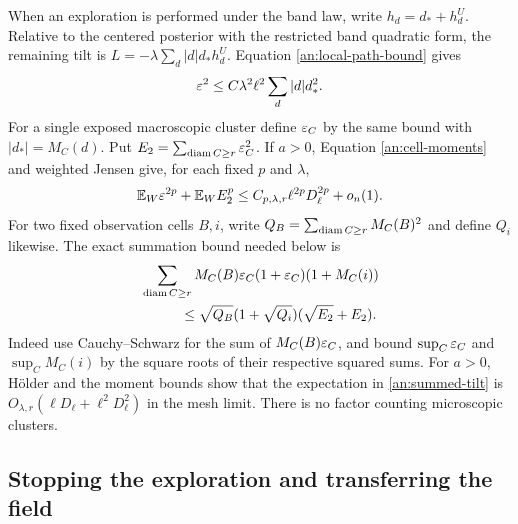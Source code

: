 When an exploration is performed under the band law, write
$h_d=d_*+h_d^U$.  Relative to the centered posterior with the
restricted band quadratic form, the remaining tilt is
$L=-\lambda\sum_d|d|d_*h_d^U$.  Equation
\eqref{an:local-path-bound} gives
\begin{equation}
 \varepsilon^2\le C\lambda^2\ell^2\sum_d|d|d_*^2.
 \label{an:exterior-tilt}
\end{equation}
For a single exposed macroscopic cluster define $\varepsilon_C$ by the
same bound with $|d_*|=M_C(d)$.  Put
$E_2=\sum_{\operatorname{diam} C\ge r}\varepsilon_C^2$.  If $a>0$, Equation
\eqref{an:cell-moments} and weighted Jensen give, for each fixed
$p$ and $\lambda$,
\begin{equation}
 \mathbb E_W\varepsilon^{2p}+\mathbb E_WE_2^p
       \le C_{p,\lambda,r}\ell^{2p}D_\ell^{2p}+o_n(1).
 \label{an:tilt-moments}
\end{equation}
For two fixed observation cells $B,i$, write
$Q_B=\sum_{\operatorname{diam} C\ge r}M_C(B)^2$ and define $Q_i$ likewise.
The exact summation bound needed below is
\begin{align}
 &\sum_{\operatorname{diam} C\ge r}M_C(B)\varepsilon_C(1+\varepsilon_C)(1+M_C(i))
 \notag\\
 &\hspace{1cm}\le
 \sqrt{Q_B}(1+\sqrt{Q_i})(\sqrt{E_2}+E_2).
 \label{an:summed-tilt}
\end{align}
Indeed use Cauchy--Schwarz for the sum of $M_C(B)\varepsilon_C$,
and bound $\sup_C\varepsilon_C$ and $\sup_CM_C(i)$ by the square roots
of their respective squared sums.  For $a>0$, H\"older and the moment bounds
show that the expectation in \eqref{an:summed-tilt} is
$O_{\lambda,r}(\ell D_\ell+\ell^2D_\ell^2)$ in the mesh limit.
There is no factor counting microscopic clusters.

\subsection{Stopping the exploration and transferring the field}

